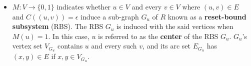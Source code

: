 \begin{defn}
\begin{itemize}
        \item \begin{math}M : V \rightarrow \{0,1\}\end{math} indicates whether \begin{math}u \in V\end{math} and every \begin{math}v \in V\end{math} where \begin{math}(u,v) \in E\end{math} and \begin{math}C((u,v)) = \epsilon\end{math} induce a sub-graph \begin{math}G_{u}\end{math} of \begin{math}R\end{math} known as a \textbf{reset-bound subsystem} (RBS). The RBS \begin{math}G_{u}\end{math} is induced with the said vertices when \begin{math}M(u) = 1\end{math}. In this case, \begin{math}u\end{math} is referred to as the \textbf{center} of the RBS \begin{math}G_{u}\end{math}. \begin{math}G_{u}\end{math}'s vertex set \begin{math}V_{G_{u}}\end{math} contains \begin{math}u\end{math} and every such \begin{math}v\end{math}, and its arc set \begin{math}E_{G_{u}}\end{math} has \begin{math}(x,y) \in E\end{math} if \begin{math}x,y \in V_{G_{u}}\end{math}.\\
        

\end{itemize}
\end{defn}
